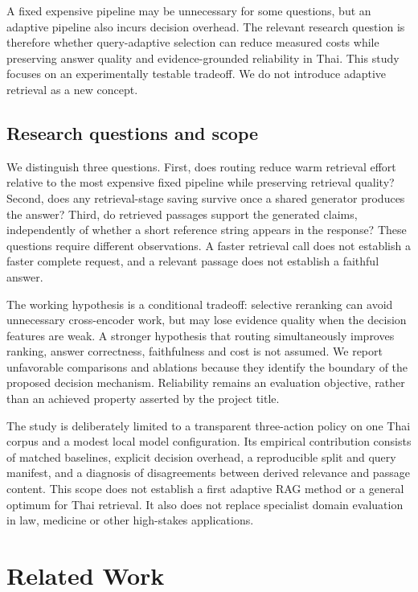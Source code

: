\documentclass[10pt,a4paper]{article}
\begin{document}
A fixed expensive pipeline may be unnecessary for some questions, but an
adaptive pipeline also incurs decision overhead. The relevant research
question is therefore whether query-adaptive selection can reduce
measured costs while preserving answer quality and evidence-grounded
reliability in Thai. This study focuses on an experimentally testable
tradeoff. We do not introduce adaptive retrieval as a new concept.

\hypertarget{research-questions-and-scope}{%
\subsection{Research questions and
scope}\label{research-questions-and-scope}}

We distinguish three questions. First, does routing reduce warm
retrieval effort relative to the most expensive fixed pipeline while
preserving retrieval quality? Second, does any retrieval-stage saving
survive once a shared generator produces the answer? Third, do retrieved
passages support the generated claims, independently of whether a short
reference string appears in the response? These questions require
different observations. A faster retrieval call does not establish a
faster complete request, and a relevant passage does not establish a
faithful answer.

The working hypothesis is a conditional tradeoff: selective reranking
can avoid unnecessary cross-encoder work, but may lose evidence quality
when the decision features are weak. A stronger hypothesis that routing
simultaneously improves ranking, answer correctness, faithfulness and
cost is not assumed. We report unfavorable comparisons and ablations
because they identify the boundary of the proposed decision mechanism.
Reliability remains an evaluation objective, rather than an achieved
property asserted by the project title.

The study is deliberately limited to a transparent three-action policy
on one Thai corpus and a modest local model configuration. Its empirical
contribution consists of matched baselines, explicit decision overhead,
a reproducible split and query manifest, and a diagnosis of
disagreements between derived relevance and passage content. This scope
does not establish a first adaptive RAG method or a general optimum for
Thai retrieval. It also does not replace specialist domain evaluation in
law, medicine or other high-stakes applications.

\hypertarget{related-work}{%
\section{Related Work}\label{related-work}}
\end{document}
